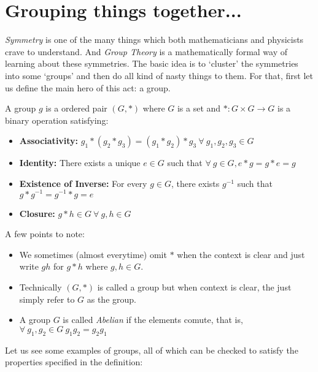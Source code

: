 \section{Grouping things together...}
\textit{Symmetry} is one of the many things which both mathematicians and physicists crave to understand. And \textit{Group Theory} is a mathematically formal way of learning about these symmetries. The basic idea is to `cluster' the symmetries into some `groups' and then do all kind of nasty things to them. For that, first let us define the main hero of this act: a group.
\begin{definition}[Group]
    A group $g$ is a ordered pair $(G,*)$ where $G$ is a set and $*:G\times G\rightarrow G$ is a binary operation satisfying:
    \begin{itemize}
        \item \textbf{Associativity:} $g_1*(g_2*g_3) = (g_1*g_2)*g_3 \ \forall \ g_1,g_2,g_3\in G$
        \item \textbf{Identity:} There exists a unique $ e\in G$ such that $\forall \ g \in G, e*g = g*e = g$
        \item \textbf{Existence of Inverse:} For every $g\in G$, there exists $g^{-1}$ such that $g*g^{-1} = g^{-1}*g = e$
        \item \textbf{Closure:} $g*h\in G \ \forall \ g,h\in G$
    \end{itemize}
\end{definition}
A few points to note:
\begin{itemize}
    \item We sometimes (almost everytime) omit $*$ when the context is clear and just write $gh$ for $g*h$ where $g,h\in G$.
    \item Technically $(G,*)$ is called a group but when context is clear, the just simply refer to $G$ as the group.
    \item A group  $G$ is called \textit{Abelian} if the elements comute, that is, $\forall \ g_1,g_2 \in G \ g_1g_2 = g_2g_1$
\end{itemize}
Let us see some examples of groups, all of which can be checked to satisfy the properties specified in the definition:
